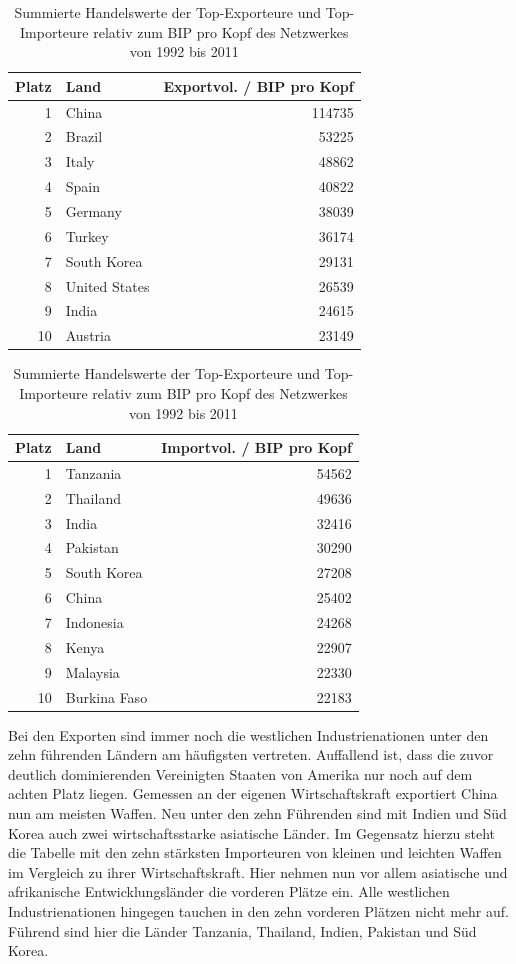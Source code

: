 \documentclass[a4paper,ngerman,oneside,titlepage,bibliography=totoc,11pt]{scrreprt}
\begin{document}
	\begin{table}[ht]

\centering

\begin{minipage}[t]{0.45\textwidth}
\footnotesize
\centering
\begin{tabular}{rlr}
  \hline
 Platz & Land & Exportvol. / BIP pro Kopf\\ 
  \hline
1 & China & 114735 \\
2 & Brazil & 53225 \\
3 & Italy & 48862 \\
4 & Spain & 40822 \\
5 & Germany & 38039 \\ 
6 & Turkey & 36174 \\
7 & South Korea & 29131 \\
8 & United States & 26539 \\
9 & India & 24615 \\
10 & Austria & 23149 \\
   \hline
	\end{tabular}
	\end{minipage}	
\hfill	
\begin{minipage}[t]{0.45\textwidth}	
\centering
\footnotesize
\begin{tabular}{rlr}
  \hline
 Platz & Land & Importvol. / BIP pro Kopf\\ 
  \hline
1 &Tanzania &54562 \\
2 &Thailand &49636\\
3 &India &32416\\
4 &Pakistan &30290\\
5 &South Korea &27208\\
6 &China &25402\\
7 &Indonesia &24268\\
8 &Kenya &22907\\
9 &Malaysia &22330\\
10 &Burkina Faso &22183\\
   \hline
\end{tabular}
\end{minipage}
\caption{Summierte Handelswerte der Top-Exporteure und Top-Importeure relativ zum BIP pro Kopf des Netzwerkes von 1992 bis 2011}
\label{tab:tops2}
\end{table} 
Bei den Exporten sind immer noch die westlichen Industrienationen unter den zehn führenden Ländern am häufigsten vertreten. Auffallend ist, dass die zuvor deutlich dominierenden Vereinigten Staaten von Amerika nur noch auf dem achten Platz liegen. Gemessen an der eigenen Wirtschaftskraft exportiert China nun am meisten Waffen. Neu unter den zehn Führenden sind mit Indien und Süd Korea auch zwei wirtschaftsstarke asiatische Länder.
Im Gegensatz hierzu steht die Tabelle mit den zehn stärksten Importeuren von kleinen und leichten Waffen im Vergleich zu ihrer Wirtschaftskraft. Hier nehmen nun vor allem asiatische und afrikanische Entwicklungsländer die vorderen Plätze ein. Alle westlichen Industrienationen hingegen tauchen in den zehn vorderen Plätzen nicht mehr auf. Führend sind hier die Länder Tanzania, Thailand, Indien, Pakistan und Süd Korea.
\end{document}
